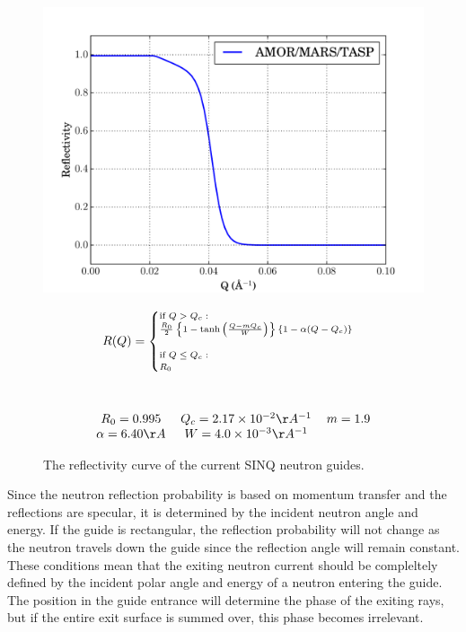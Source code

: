 \documentclass[a4paper]{jpconf}
\begin{document}
\begin{figure}[h]
\begin{minipage}{14pc}
\includegraphics[scale=.4]{graphics/refl.pdf}
\caption{\label{SINQ_reflectivity} The reflectivity curve of the current SINQ neutron guides.}
\end{minipage}\hspace{5pc}%
\begin{minipage}{11pc}
\begin{multline}\label{eq:ref}\scriptsize
R(Q) = 
\begin{cases}
    \mbox{if } Q > Q_c : \\
    \frac{R_0}{2}\left\{  1 - \tanh\left(  \frac{Q - m Q_c}{W}\right) \right\}\{1-\alpha(Q-Q_c)\} \\
    \\
    \mbox{if } Q \leq Q_c :\\
    R_0 \\
\end{cases} \\ \\ \\
\begin{tabular}{c c c}
$R_0=0.995$ & $Q_c=2.17\times10^{-2}\AA^{-1}$ & $m=1.9$ \\ 
$\alpha=6.40 \AA$ & $W=4.0\times10^{-3} \AA^{-1}$ 
\end{tabular} \\
\end{multline}
\end{minipage} 
\end{figure}

Since the neutron reflection probability is based on momentum transfer and the reflections are specular, it is determined by the incident neutron angle and energy.  If the guide is rectangular, the reflection probability will not change as the neutron travels down the guide since the reflection angle will remain constant.  These conditions mean that the exiting neutron current should be compleltely defined by the incident polar angle and energy of a neutron entering the guide.  The position in the guide entrance will determine the phase of the exiting rays, but if the entire exit surface is summed over, this phase becomes irrelevant.
\end{document}
